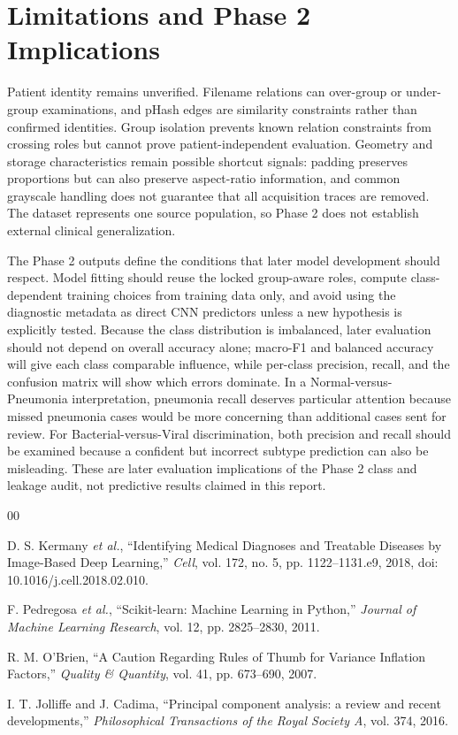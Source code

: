 \documentclass[conference]{IEEEtran}
\begin{document}
\section{Limitations and Phase 2 Implications}

Patient identity remains unverified. Filename relations can over-group or under-group examinations, and pHash edges are similarity constraints rather than confirmed identities. Group isolation prevents known relation constraints from crossing roles but cannot prove patient-independent evaluation. Geometry and storage characteristics remain possible shortcut signals: padding preserves proportions but can also preserve aspect-ratio information, and common grayscale handling does not guarantee that all acquisition traces are removed. The dataset represents one source population, so Phase 2 does not establish external clinical generalization.

The Phase 2 outputs define the conditions that later model development should respect. Model fitting should reuse the locked group-aware roles, compute class-dependent training choices from training data only, and avoid using the diagnostic metadata as direct CNN predictors unless a new hypothesis is explicitly tested. Because the class distribution is imbalanced, later evaluation should not depend on overall accuracy alone; macro-F1 and balanced accuracy will give each class comparable influence, while per-class precision, recall, and the confusion matrix will show which errors dominate. In a Normal-versus-Pneumonia interpretation, pneumonia recall deserves particular attention because missed pneumonia cases would be more concerning than additional cases sent for review. For Bacterial-versus-Viral discrimination, both precision and recall should be examined because a confident but incorrect subtype prediction can also be misleading. These are later evaluation implications of the Phase 2 class and leakage audit, not predictive results claimed in this report.

\balance
\begin{thebibliography}{00}

D. S. Kermany \emph{et al.}, ``Identifying Medical Diagnoses and Treatable Diseases by Image-Based Deep Learning,'' \emph{Cell}, vol. 172, no. 5, pp. 1122--1131.e9, 2018, doi: 10.1016/j.cell.2018.02.010.

F. Pedregosa \emph{et al.}, ``Scikit-learn: Machine Learning in Python,'' \emph{Journal of Machine Learning Research}, vol. 12, pp. 2825--2830, 2011.

R. M. O'Brien, ``A Caution Regarding Rules of Thumb for Variance Inflation Factors,'' \emph{Quality \& Quantity}, vol. 41, pp. 673--690, 2007.

I. T. Jolliffe and J. Cadima, ``Principal component analysis: a review and recent developments,'' \emph{Philosophical Transactions of the Royal Society A}, vol. 374, 2016.

\end{thebibliography}
\end{document}
